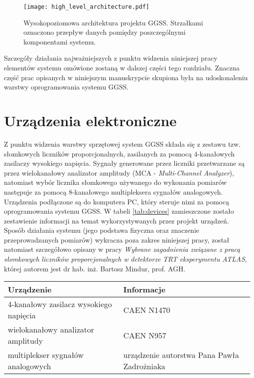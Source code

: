 \begin{figure}[H]
\centering
\texttt{[image: high\_level\_architecture.pdf]}
\caption{Wysokopoziomowa architektura projektu GGSS. Strzałkami oznaczono przepływ danych pomiędzy poszczególnymi komponentami systemu.}
\label{fig:high_level_architecture}
\end{figure}


Szczegóły działania najważniejszych z punktu widzenia niniejszej pracy elementów systemu omówione zostaną w dalszej części tego rozdziału. Znaczna część prac opisanych w niniejszym manuskrypcie skupiona była na udoskonaleniu warstwy oprogramowania systemu GGSS.


\section{Urządzenia elektroniczne}
Z punktu widzenia warstwy sprzętowej system GGSS składa się z zestawu tzw. słomkowych liczników proporcjonalnych, zasilanych za pomocą 4-kanałowych zasilaczy wysokiego napięcia. Sygnały generowane przez liczniki przetwarzane są przez wielokanałowy analizator amplitudy (MCA - \emph{Multi-Channel Analyzer}), natomiast wybór licznika słomkowego używanego do wykonania pomiarów następuje za pomocą 8-kanałowego multipleksera sygnałów analogowych. Urządzenia podłączone są do komputera PC, który steruje nimi za pomocą oprogramowania systemu GGSS. W tabeli \ref{tab:devices} zamieszczone zostało zestawienie informacji na temat wykorzystywanych przez projekt urządzeń. Sposób działania systemu (jego podstawa fizyczna oraz znaczenie przeprowadzanych pomiarów) wykracza poza zakres niniejszej pracy, został natomiast szczegółowo opisany w pracy \emph{Wybrane zagadnienia związane z pracą słomkowych liczników proporcjonalnych w detektorze TRT eksperymentu ATLAS}, której autorem jest dr hab. inż. Bartosz Mindur, prof. AGH.

\clearpage

\begin{table*}[htbp]
\centering
\caption{Zestawienie istotnych z punktu widzenia niniejszej pracy urządzeń wchodzących w skład systemu GGSS.}
\label{tab:devices}
\begin{tabularx}{\textwidth}{@{}XX@{}}
\toprule
Urządzenie &
Informacje \\
\midrule
4-kanałowy zasilacz wysokiego napięcia & CAEN N1470 \\
wielokanałowy analizator amplitudy & CAEN N957 \\
multiplekser sygnałów analogowych & urządzenie autorstwa Pana Pawła Zadrożniaka\\
\bottomrule
\end{tabularx}
\end{table*}


